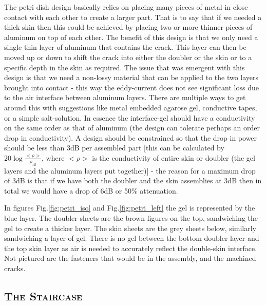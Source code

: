 \documentclass[12pt]{article}
\begin{document}
The petri dish design basically relies on placing many pieces of metal in close contact with each other to create a larger part. That is to say that if we needed a thick skin then this could be achieved by placing two or more thinner pieces of aluminum on top of each other. The benefit of this design is that we only need a single thin layer of aluminum that contains the crack. This layer can then be moved up or down to shift the crack into either the doubler or the skin or to a specific depth in the skin as required. The issue that was emergent with this design is that we need a non-lossy material that can be applied to the two layers brought into contact - this way the eddy-current does not see significant loss due to the air interface between aluminum layers. There are multiple ways to get around this with suggestions like metal embedded agarose gel, conductive tapes, or a simple salt-solution. In essence the interface-gel should have a conductivity on the same order as that of aluminum (the design can tolerate perhaps an order drop in conductivity). A design should be constrained so that the drop in power should be less than 3dB per assembled part [this can be calculated by $20 \log{\frac{<\rho>}{\rho_{Al}}}$, where $<\rho>$ is the conductivity of entire skin or doubler (the gel layers and the aluminum layers put together)] - the reason for a maximum drop of 3dB is that if we have both the doubler and the skin assemblies at 3dB then in total we would have a drop of 6dB or 50\% attenuation. 

In figures Fig.\ref{fig:petri_iso} and Fig.\ref{fig:petri_left} the gel is represented by the blue layer. The doubler sheets are the brown figures on the top, sandwiching the gel to create a thicker layer. The skin sheets are the grey sheets below, similarly sandwiching a layer of gel. There is no gel between the bottom doubler layer and the top skin layer as air is needed to accurately reflect the double-skin interface. Not pictured are the fasteners that would be in the assembly, and the machined cracks.
\clearpage
\subsection{\textsc{The Staircase} }
\end{document}
